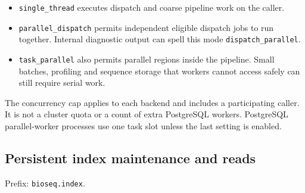 \begin{itemize}
  \item \texttt{single\_thread} executes dispatch and coarse pipeline work on
    the caller.
  \item \texttt{parallel\_dispatch} permits independent eligible dispatch jobs
    to run together. Internal diagnostic output can spell this mode
    \texttt{dispatch\_parallel}.
  \item \texttt{task\_parallel} also permits parallel regions inside the
    pipeline. Small batches, profiling and sequence storage that workers cannot
    access safely can still require serial work.
\end{itemize}
The concurrency cap applies to each backend and includes a participating
caller. It is not a cluster quota or a count of extra PostgreSQL workers.
PostgreSQL parallel-worker processes use one task slot unless the last setting
is enabled.

\subsection{Persistent index maintenance and reads}

Prefix: \nolinkurl{bioseq.index}.

